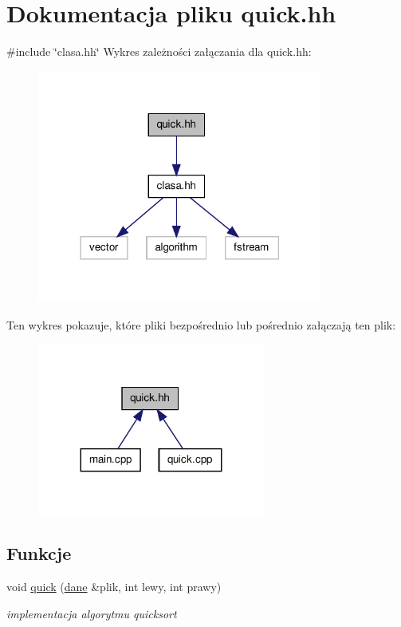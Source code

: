 \hypertarget{quick_8hh}{\section{\-Dokumentacja pliku quick.\-hh}
\label{quick_8hh}
}
{\ttfamily \#include \char`\"{}clasa.\-hh\char`\"{}}\*
\-Wykres zależności załączania dla quick.\-hh\-:\nopagebreak
\begin{figure}[H]
\begin{center}
\leavevmode
\includegraphics[width=266pt]{quick_8hh__incl}
\end{center}
\end{figure}
\-Ten wykres pokazuje, które pliki bezpośrednio lub pośrednio załączają ten plik\-:\nopagebreak
\begin{figure}[H]
\begin{center}
\leavevmode
\includegraphics[width=212pt]{quick_8hh__dep__incl}
\end{center}
\end{figure}
\subsection*{\-Funkcje}
\begin{DoxyCompactItemize}
\item 
void \hyperlink{quick_8hh_a017b6de88403ed8f5d857c77e57c69d5}{quick} (\hyperlink{classdane}{dane} \&plik, int lewy, int prawy)
\begin{DoxyCompactList}\small\item\em implementacja algorytmu quicksort \end{DoxyCompactList}\end{DoxyCompactItemize}


